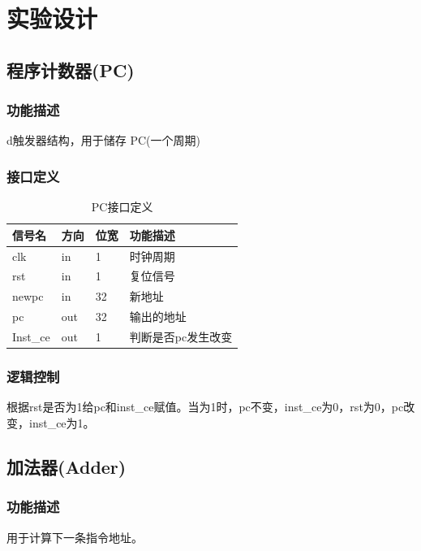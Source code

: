 \section{实验设计}
\subsection{程序计数器(PC)}\label{sub:PC}
\subsubsection{功能描述}
d触发器结构，用于储存 PC(一个周期)
\subsubsection{接口定义}
\begin{table}[htp]
	\caption{PC接口定义}\label{tab:pcdef}
	\begin{center}
		\begin{tabular}{|l|l|l|p{6cm}|}
		\hline
		\textbf{信号名} & \textbf{方向} & \textbf{位宽} & \textbf{功能描述}\\ \hline \hline
		clk     & in    & 1     & 时钟周期\\ 
		rst     & in    & 1     & 复位信号\\ 
		newpc   & in    & 32    & 新地址\\ 
		pc      & out   & 32    & 输出的地址\\ 
		Inst\_ce & out  & 1     & 判断是否pc发生改变\\ 
		\hline
		\end{tabular}
	\end{center}
	\end{table}
\subsubsection{逻辑控制}
根据rst是否为1给pc和inst\_ce赋值。当为1时，pc不变，inst\_ce为0，rst为0，pc改变，inst\_ce为1。
\subsection{加法器(Adder)}\label{sub:adder}
\subsubsection{功能描述}
用于计算下一条指令地址。
